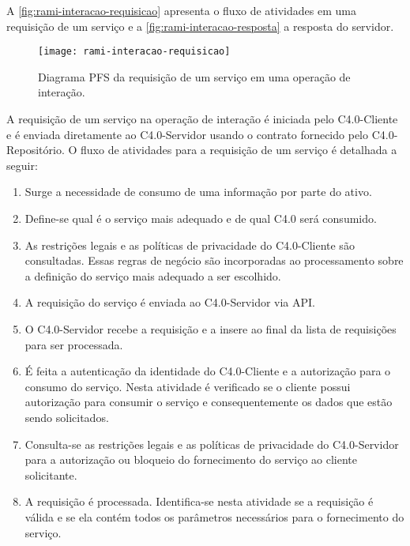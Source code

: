 A \autoref{fig:rami-interacao-requisicao} apresenta o fluxo de atividades em uma requisição de um serviço e a \autoref{fig:rami-interacao-resposta} a resposta do servidor.

\begin{figure}[htb]
	\centering
	\texttt{[image: rami-interacao-requisicao]}
	\caption{Diagrama PFS da requisição de um serviço em uma operação de interação.}
	\label{fig:rami-interacao-requisicao}
\end{figure}

A requisição de um serviço na operação de interação é iniciada pelo C4.0-Cliente e é enviada diretamente ao C4.0-Servidor usando o contrato fornecido pelo C4.0-Repositório. O fluxo de atividades para a requisição de um serviço é detalhada a seguir:

\begin{enumerate}

	\item Surge a necessidade de consumo de uma informação por parte do ativo.

	\item Define-se qual é o serviço mais adequado e de qual C4.0 será consumido.

	\item As restrições legais e as políticas de privacidade do C4.0-Cliente são consultadas. Essas regras de negócio são incorporadas ao processamento sobre a definição do serviço mais adequado a ser escolhido.

	\item A requisição do serviço é enviada ao C4.0-Servidor via API.

	\item O C4.0-Servidor recebe a requisição e a insere ao final da lista de requisições para ser processada.

	\item É feita a autenticação da identidade do C4.0-Cliente e a autorização para o consumo do serviço. Nesta atividade é verificado se o cliente possui autorização para consumir o serviço e consequentemente os dados que estão sendo solicitados.

	\item Consulta-se as restrições legais e as políticas de privacidade do C4.0-Servidor para a autorização ou bloqueio do fornecimento do serviço ao cliente solicitante.

	\item A requisição é processada. Identifica-se nesta atividade se a requisição é válida e se ela contém todos os parâmetros necessários para o fornecimento do serviço.

\end{enumerate}

